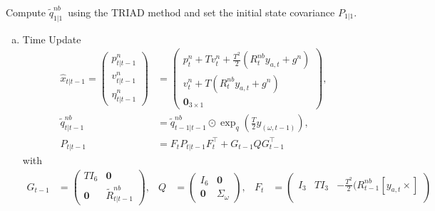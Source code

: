 \documentclass{article}
\begin{document}

\begin{algorithm}
\DontPrintSemicolon %
Compute $\tilde{q}_{1 | 1}^{nb}\,$ using the TRIAD method and set the initial state covariance $P_{1|1}$.\\
 {
  \begin{enumerate}[(a)]
      \item Time Update
\begin{align}
    \hat{x}_{t | t -1} = 
    \begin{pmatrix}
    p_{t | t -1}^n\\
    v_{t | t -1}^n\\
    \hat{\eta}_{t | t -1}^n
    \end{pmatrix} &=
    \begin{pmatrix}
    p_t^n + T v_t^n + \frac{T^2}{2}(R_t^{nb}  y_{a,t} + g^n)\\
    v_t^n + T (R_t^{nb}  y_{a,t} + g^n)\\
    \mathbf{0}_{3\times1}
    \end{pmatrix},\\
    \tilde{q}_{t | t - 1}^{nb} &=  \tilde{q}_{t - 1 | t - 1}^{nb} \odot \exp_q\left(\frac{T}{2} y_(\omega, t-1) \right),\\
    P_{t | t-1} &= F_t P_{t | t-1} F_t^\top + G_{t-1} Q G_{t-1}^\top
\end{align}
with 
\begin{align*}
    G_{t-1} &= 
    \begin{pmatrix}
    T I_6 &\mathbf{0}\\
    \mathbf{0} &\tilde{R}_{t | t - 1}^{nb}
    \end{pmatrix},&
    Q &= \begin{pmatrix}
    I_6 &\mathbf{0}\\
    \mathbf{0} &\Sigma_\omega
    \end{pmatrix},& 
    F_t &= \begin{pmatrix}
    I_3 &T I_3 &-\frac{T^2}{2}(R_{t-1}^{nb}  [y_{a,t} \times] \\

\end{pmatrix}
\end{align*}
\end{enumerate}}
\end{algorithm}
\end{document}

